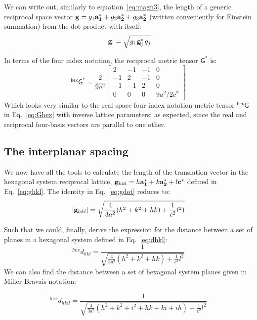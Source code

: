 We can write out, similarly to equation~\ref{eq:magn3}, the length of a generic reciprocal space vector $\vb{g}=g_1\vb{a_1^*}+g_2\vb{a_2^*}+g_3\vb{a_2^*}$ (written conveniently for Einstein summation) from the dot product with itself:
\begin{equation}
\label{eq:gdot}
|\vb{g}| = \sqrt{g_i \, \mathsf{g_{ij}^*}\, g_j}
\end{equation}

In terms of the four index notation, the reciprocal metric tensor $\mathsf{G^*}$ is:
\begin{equation}
\label{eq:Gstar}
\mathsf{^{hex}G^*} =\frac{2}{9a^2}\begin{bmatrix}
2 & -1 & -1 & 0 \\
-1 & 2 & -1 & 0 \\
-1 & -1 & 2 & 0 \\
0 & 0 & 0 & 9a^2/2c^2 
\end{bmatrix}
\end{equation}
Which looks very similar to the real space four-index notation metric tensor $\mathsf{^{hex}G}$ in Eq.~\ref{eq:Ghex} with inverse lattice parameters; as expected, since the real and reciprocal four-basis vectors are parallel to one other.



\subsection{The interplanar spacing}

We now have all the tools to calculate the length of the translation vector in the hexagonal system reciprocal lattice, $\vb{g}_{hkl}=h\vb{a_1^*}+k\vb{a_2^*}+l\vb{c^*}$ defined in Eq.~\ref{eq:ghkl}. The identity in Eq.~\ref{eq:gdot} reduces to: 
\begin{equation*}
|\vb{g}_{hkl}|= \sqrt{\frac{4}{3a^2}(h^2 + k^2 + h k) + \frac{1}{c^2}l^2)}
\end{equation*}


Such that we could, finally, derive the expression for the distance between a set of planes  in a hexagonal system defined in Eq.~\ref{eq:dhkl}:
\begin{equation}
^{hex}d_{hkl} = \frac{1}{\sqrt{\frac{4}{3a^2} (h^2 + k^2 + h k) + \frac{1}{c^2}l^2}}
\label{eq:d_hex}
\end{equation}
We can also find the distance between a set of hexagonal system planes  given in Miller-Bravais notation:

\begin{equation}
^{hex}d_{hkil} = \frac{1}{\sqrt{\frac{4}{3a^2} (h^2 + k^2 + i^2 + h k + k i + i h) + \frac{1}{c^2}l^2}}
\label{eq:d_hex_MB}
\end{equation}

